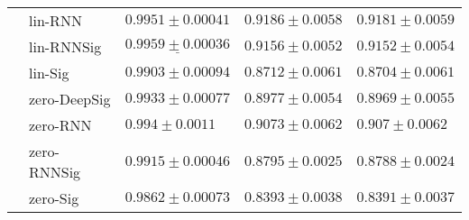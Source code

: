 \begin{tabular}{lllll}
       & lin-RNN &                           $ 0.9951 \pm 0.00041 $ &                           $ 0.9186 \pm 0.0058 $ &                           $ 0.9181 \pm 0.0059 $ \\
       & lin-RNNSig &            $  \underline{ 0.9959 \pm 0.00036 } $ &                           $ 0.9156 \pm 0.0052 $ &                           $ 0.9152 \pm 0.0054 $ \\
       & lin-Sig &                           $ 0.9903 \pm 0.00094 $ &                           $ 0.8712 \pm 0.0061 $ &                           $ 0.8704 \pm 0.0061 $ \\
       & zero-DeepSig &                           $ 0.9933 \pm 0.00077 $ &                           $ 0.8977 \pm 0.0054 $ &                           $ 0.8969 \pm 0.0055 $ \\
       & zero-RNN &                             $ 0.994 \pm 0.0011 $ &                           $ 0.9073 \pm 0.0062 $ &                            $ 0.907 \pm 0.0062 $ \\
       & zero-RNNSig &                           $ 0.9915 \pm 0.00046 $ &                           $ 0.8795 \pm 0.0025 $ &                           $ 0.8788 \pm 0.0024 $ \\
       & zero-Sig &                           $ 0.9862 \pm 0.00073 $ &                           $ 0.8393 \pm 0.0038 $ &                           $ 0.8391 \pm 0.0037 $ \\
\bottomrule
\end{tabular}
